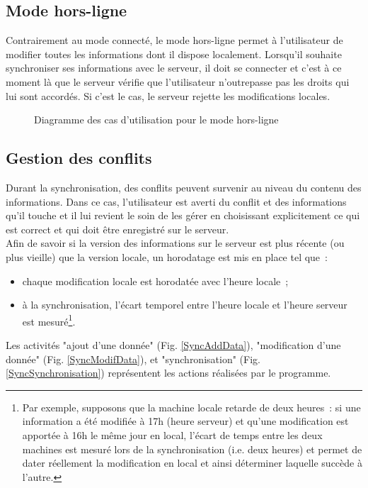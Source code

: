 \subsection{Mode hors-ligne}
Contrairement au mode connecté, le mode hors-ligne permet à l'utilisateur de modifier toutes les informations dont il dispose localement.
Lorsqu'il souhaite synchroniser ses informations avec le serveur, il doit se connecter et c'est à ce moment là que le serveur vérifie que l'utilisateur n'outrepasse pas les droits qui lui sont accordés.
Si c'est le cas, le serveur rejette les modifications locales.
\begin{figure}[htbp]
    \centering
	\caption{Diagramme des cas d'utilisation pour le mode hors-ligne}
	\label{ucmodedeco}
\end{figure}

\subsection{Gestion des conflits}
Durant la synchronisation, des conflits peuvent survenir au niveau du contenu des informations.
Dans ce cas, l'utilisateur est averti du conflit et des informations qu'il touche et il lui revient le soin de les gérer en choisissant explicitement ce qui est correct et qui doit être enregistré sur le serveur.
\\
Afin de savoir si la version des informations sur le serveur est plus récente (ou plus vieille) que la version locale, un horodatage est mis en place tel que~:
\begin{itemize}
	\item chaque modification locale est horodatée avec l'heure locale~;
	\item à la synchronisation, l'écart temporel entre l'heure locale et l'heure serveur est mesuré\footnote{Par exemple, supposons que la machine locale retarde de deux heures~: si une information a été modifiée à 17h (heure serveur) et qu'une modification est apportée à 16h le même jour en local, l'écart de temps entre les deux machines est mesuré lors de la synchronisation (i.e. deux heures) et permet de dater réellement la modification en local et ainsi déterminer laquelle succède à l'autre.}.
\end{itemize}
Les activités "ajout d'une donnée" (Fig. \ref{SyncAddData}), "modification d'une donnée" (Fig. \ref{SyncModifData}), et "synchronisation" (Fig. \ref{SyncSynchronisation}) représentent les actions réalisées par le programme.


